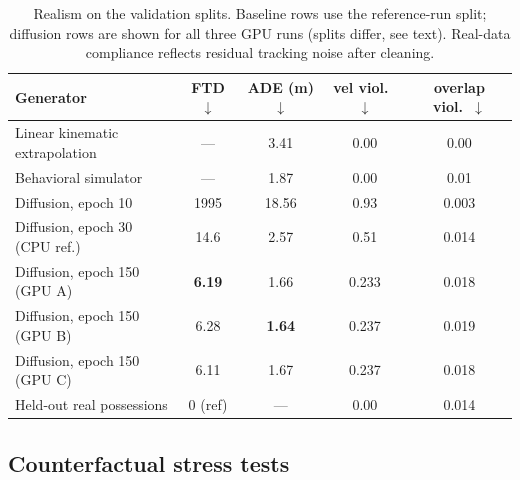 \documentclass[11pt]{article}
\begin{document}
\begin{table}[t]
\centering
\caption{Realism on the validation splits. Baseline rows use the
reference-run split; diffusion rows are shown for all three GPU runs
(splits differ, see text). Real-data compliance reflects residual tracking
noise after cleaning.}
\label{tab:realism}
\begin{tabular}{lcccc}
\toprule
Generator & FTD $\downarrow$ & ADE (m) $\downarrow$ & vel viol.\ $\downarrow$ & overlap viol.\ $\downarrow$ \\
\midrule
Linear kinematic extrapolation & --- & 3.41 & 0.00 & 0.00 \\
Behavioral simulator & --- & 1.87 & 0.00 & 0.01 \\
Diffusion, epoch 10 & 1995 & 18.56 & 0.93 & 0.003 \\
Diffusion, epoch 30 (CPU ref.) & 14.6 & 2.57 & 0.51 & 0.014 \\
Diffusion, epoch 150 (GPU A) & \textbf{6.19} & 1.66 & 0.233 & 0.018 \\
Diffusion, epoch 150 (GPU B) & 6.28 & \textbf{1.64} & 0.237 & 0.019 \\
Diffusion, epoch 150 (GPU C) & 6.11 & 1.67 & 0.237 & 0.018 \\
\midrule
Held-out real possessions & 0 (ref) & --- & 0.00 & 0.014 \\
\bottomrule
\end{tabular}
\end{table}

\subsection{Counterfactual stress tests}
\label{sec:res-cf}
\end{document}
